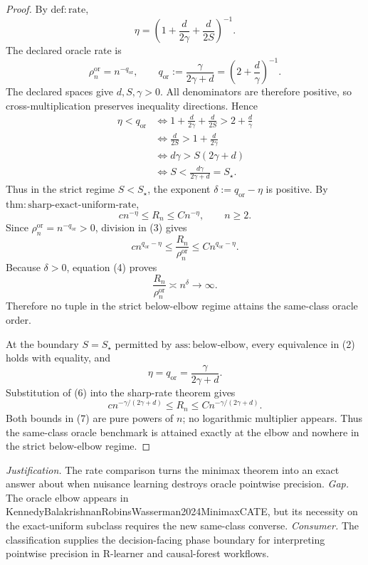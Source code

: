 \documentclass{article}
\begin{document}
\begin{proof}
By \(\mathrm{def:rate}\),
\[
 \eta=\left(1+\frac d{2\gamma}+\frac d{2S}\right)^{-1}.
\]
The declared oracle rate is
\[
 \rho_n^{\mathrm{or}}=n^{-q_{\mathrm{or}}},
 \qquad q_{\mathrm{or}}:=\frac\gamma{2\gamma+d}
 =\left(2+\frac d\gamma\right)^{-1}.                            \tag{1}
\]
The declared spaces give \(d,S,\gamma>0\).  All denominators are therefore positive, so cross-multiplication preserves inequality directions.  Hence
\[
\begin{aligned}
 \eta<q_{\mathrm{or}}
 &\Longleftrightarrow
 1+\frac d{2\gamma}+\frac d{2S}>2+\frac d\gamma\\
 &\Longleftrightarrow \frac d{2S}>1+\frac d{2\gamma}\\
 &\Longleftrightarrow d\gamma>S(2\gamma+d)\\
 &\Longleftrightarrow
 S<\frac{d\gamma}{2\gamma+d}=S_\star.                         \tag{2}
\end{aligned}
\]
Thus in the strict regime \(S<S_\star\), the exponent \(\delta:=q_{\mathrm{or}}-\eta\) is positive.  By \(\mathrm{thm:sharp\mbox{-}exact\mbox{-}uniform\mbox{-}rate}\),
\[
 cn^{-\eta}\le R_n\le Cn^{-\eta},
 \qquad n\ge2.                                                   \tag{3}
\]
Since \(\rho_n^{\mathrm{or}}=n^{-q_{\mathrm{or}}}>0\), division in (3) gives
\[
 cn^{q_{\mathrm{or}}-\eta}
 \le\frac{R_n}{\rho_n^{\mathrm{or}}}
 \le Cn^{q_{\mathrm{or}}-\eta}.                               \tag{4}
\]
Because \(\delta>0\), equation (4) proves
\[
 \frac{R_n}{\rho_n^{\mathrm{or}}}\asymp n^\delta\longrightarrow\infty. \tag{5}
\]
Therefore no tuple in the strict below-elbow regime attains the same-class oracle order.

At the boundary \(S=S_\star\) permitted by \(\mathrm{ass:below\mbox{-}elbow}\), every equivalence in (2) holds with equality, and
\[
 \eta=q_{\mathrm{or}}=\frac\gamma{2\gamma+d}.                  \tag{6}
\]
Substitution of (6) into the sharp-rate theorem gives
\[
 cn^{-\gamma/(2\gamma+d)}
 \le R_n\le Cn^{-\gamma/(2\gamma+d)}.                          \tag{7}
\]
Both bounds in (7) are pure powers of \(n\); no logarithmic multiplier appears.  Thus the same-class oracle benchmark is attained exactly at the elbow and nowhere in the strict below-elbow regime.
\end{proof}
\par\smallskip\noindent \textit{Justification.} The rate comparison turns the minimax theorem into an exact answer about when nuisance learning destroys oracle pointwise precision. \textit{Gap.} The oracle elbow appears in KennedyBalakrishnanRobinsWasserman2024MinimaxCATE, but its necessity on the exact-uniform subclass requires the new same-class converse. \textit{Consumer.} The classification supplies the decision-facing phase boundary for interpreting pointwise precision in R-learner and causal-forest workflows.
\end{document}
